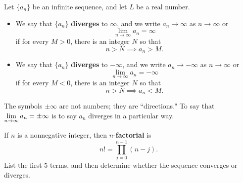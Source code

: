 \begin{definition}
Let $\{a_n\}$ be an infinite sequence, and let $L$ be a real number.
\begin{itemize}
\item We say that $\{a_n\}$ \textbf{diverges} to $\infty$, and we write $a_n\to\infty$ as $n\to\infty$ or
\begin{equation*}
\lim_{n\to\infty}a_n = \infty
\end{equation*}
if for every $M>0$, there is an integer $N$ so that
\begin{equation*}
n>N\implies a_n>M.
\end{equation*}
\item We say that $\{a_n\}$ \textbf{diverges} to $-\infty$, and we write $a_n\to -\infty$ as $n\to\infty$ or
\begin{equation*}
\lim_{n\to\infty}a_n = -\infty
\end{equation*}
if for every $M<0$, there is an integer $N$ so that
\begin{equation*}
n>N\implies a_n<M.
\end{equation*}
\end{itemize}
\end{definition}

\begin{remark}
The symbols $\pm\infty$ are not numbers; they are ``directions."
To say that $\displaystyle\lim_{n\to\infty} a_n = \pm\infty$ is to say $a_n$ diverges in a particular way.
\end{remark}

\begin{example}
If $n$ is a nonnegative integer, then $n$-\textbf{factorial} is 
\begin{equation*}
n! = \prod_{j=0}^{n-1}\left(n-j\right).
\end{equation*}
List the first 5 terms, and then determine whether the sequence converges or diverges.
\end{example}
\ifdefined\SOLUTION
{}
\else
\fi
\newpage

